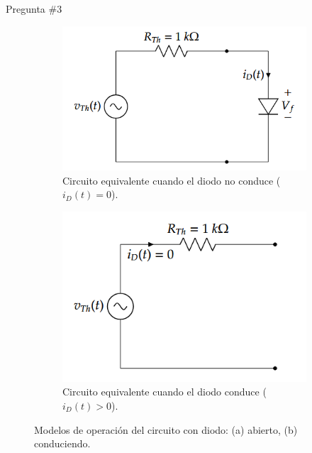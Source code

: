 \documentclass[
    10pt,
    aspectratio=169,
    xcolor={dvipsnames},
    spanish,
    ]{beamer}
\begin{document}
\begin{frame}{Pregunta \#3}

\begin{figure}[H]
  \centering
  \begin{subfigure}[b]{0.48\textwidth}
    \centering
    \includegraphics[width=0.9\linewidth]{Auxiliar_4_13}
    \caption{Circuito equivalente cuando el diodo no conduce ($i_D(t) = 0$).}
    \label{fig:diodo-abierto}
  \end{subfigure}\hfill
  \begin{subfigure}[b]{0.48\textwidth}
    \centering
    \includegraphics[width=0.9\linewidth]{Auxiliar_4_14}
    \caption{Circuito equivalente cuando el diodo conduce ($i_D(t) > 0$).}
    \label{fig:diodo-conduce}
  \end{subfigure}
  \caption{Modelos de operación del circuito con diodo: (a) abierto, (b) conduciendo.}
  \label{fig:diodo-operacion-casos}
\end{figure}
\end{frame}
\end{document}
